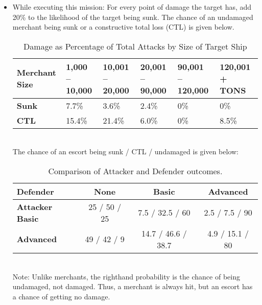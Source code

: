 \documentclass{article}
\begin{document}
\begin{itemize}
            \item{While executing this mission:}
                For every point of damage the target has, add 20\% to the likelihood of the target being sunk. The chance of an undamaged merchant being sunk or a constructive total loss (CTL) is given below. \\
                \begin{table}[h!]
                \centering
                \begin{tabularx}{\textwidth}{|X|X|X|X|X|X|}
                \hline
                \textbf{Merchant Size} & \textbf{1,000 – 10,000} & \textbf{10,001 – 20,000} & \textbf{20,001 – 90,000} & \textbf{90,001 – 120,000} & \textbf{120,001 + TONS} \\
                \hline
                \textbf{Sunk} & 7.7\% & 3.6\% & 2.4\% & 0\% & 0\% \\
                \hline
                \textbf{CTL} & 15.4\% & 21.4\% & 6.0\% & 0\% & 8.5\% \\
                \hline
                \end{tabularx}
                \caption{Damage as Percentage of Total Attacks by Size of Target Ship}
                \label{table:ChineseShipwithMissilesvsShipDamage}
                \end{table}
                \\ The chance of an escort being sunk / CTL / undamaged is given below:\\
                \begin{table}[h!]
                    \centering
                    \begin{tabular}{@{}lccc@{}}
                    \toprule
                    \textbf{Defender} & \textbf{None} & \textbf{Basic} & \textbf{Advanced} \\
                    \midrule
                    \textbf{Attacker} \textbf{Basic}    & 25 / 50 / 25    & 7.5 / 32.5 / 60     & 2.5 / 7.5 / 90     \\
                    \textbf{Advanced} & 49 / 42 / 9     & 14.7 / 46.6 / 38.7 & 4.9 / 15.1 / 80     \\
                    \bottomrule
                    \end{tabular}
                    \caption{Comparison of Attacker and Defender outcomes.}
                    \label{tab:Chance of a Chinese Ship hitting an escort ship}
                    \end{table}
                \\Note: Unlike merchants, the righthand probability is the chance of being undamaged, not damaged. Thus, a merchant is always hit, but an escort has a chance of getting no damage.\\

\end{itemize}
\end{document}
